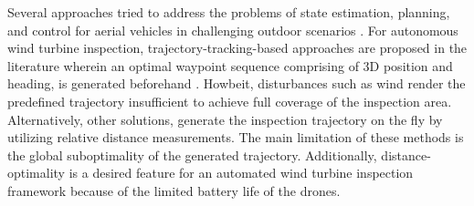 \documentclass[letterpaper, 10 pt, conference]{ieeeconf}  %
\begin{document}
Several approaches tried to address the problems of state estimation, planning, and control for aerial vehicles in challenging outdoor scenarios \cite{jakob,micha,aruco}. For autonomous wind turbine inspection, trajectory-tracking-based approaches are proposed in the literature wherein an optimal waypoint sequence comprising of 3D position and heading, is generated beforehand \cite{CPP,3dmodeling,SIP}. Howbeit, disturbances such as wind render the predefined trajectory insufficient to achieve full coverage of the inspection area.
Alternatively, other solutions, \cite{mohit,lidar} generate the inspection trajectory on the fly by utilizing relative distance measurements. The main limitation of these methods is the global suboptimality of the generated trajectory. Additionally, distance-optimality is a desired feature for an automated wind turbine inspection framework because of the limited battery life of the drones.
\end{document}
